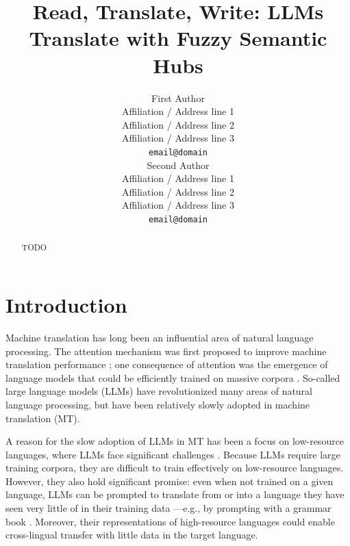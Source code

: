\documentclass[11pt]{article}
\title{Read, Translate, Write: LLMs Translate with Fuzzy Semantic Hubs}
\author{First Author \\
  Affiliation / Address line 1 \\
  Affiliation / Address line 2 \\
  Affiliation / Address line 3 \\
  \texttt{email@domain} \\\And
  Second Author \\
  Affiliation / Address line 1 \\
  Affiliation / Address line 2 \\
  Affiliation / Address line 3 \\
  \texttt{email@domain} \\}
\begin{document}
\maketitle
\begin{abstract}
TODO
\end{abstract}

\section{Introduction}

Machine translation has long been an influential area of natural language processing. The attention mechanism was first proposed to improve machine translation performance \citep{bahdanau2015neuralmachinetranslationjointly,luong-etal-2015-effective,vaswani2017attention}; one consequence of attention was the emergence of language models that could be efficiently trained on massive corpora \citep{devlin-etal-2019-bert,radford2018improving}. So-called large language models (LLMs) have revolutionized many areas of natural language processing, but have been relatively slowly adopted in machine translation (MT).

A reason for the slow adoption of LLMs in MT has been a focus on low-resource languages, where LLMs face significant challenges \citep{hendy2023goodgptmodelsmachine,robinson2023chatgptmtcompetitivehigh}. Because LLMs require large training corpora, they are difficult to train effectively on low-resource languages. However, they also hold significant promise: even when not trained on a given language, LLMs can be prompted to translate from or into a language they have seen very little of in their training data \citep{cahyawijaya-etal-2024-llms}---e.g., by prompting with a grammar book \citep{tanzer2024a}. Moreover, their representations of high-resource languages could enable cross-lingual transfer \citep{conneau-etal-2020-unsupervised} with little data in the target language.
\end{document}
